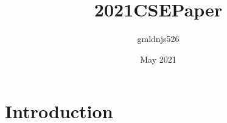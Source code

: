 \documentclass{article}
\title{2021CSEPaper}
\author{gmldnjs526 }
\date{May 2021}
\begin{document}
\maketitle

\section{Introduction}
\end{document}

